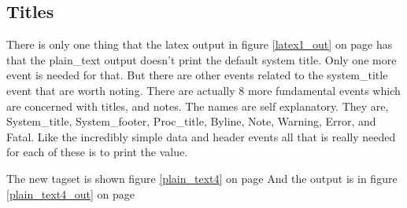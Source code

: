 \subsection{Titles}
There is only one thing that the latex output in figure 
\ref{latex1_out} on page \pageref{latex1_out} has that the plain\_text output doesn't
print the default system title.  Only one more event is needed for that.
But there are other events related to the system\_title event that are worth
noting. There are actually 8 more 
fundamental events which are concerned with titles, and notes.  The names
are self explanatory.  They are, System\_title, System\_footer, Proc\_title,
Byline, Note, Warning, Error, and Fatal.  
Like the incredibly simple data and header events all that is really needed for
each of these is to print the value.  

The new tagset is shown figure \ref{plain_text4} on page \pageref{plain_text4} 
And the output is in figure \ref{plain_text4_out} 
on page \pageref{plain_text4_out} 

